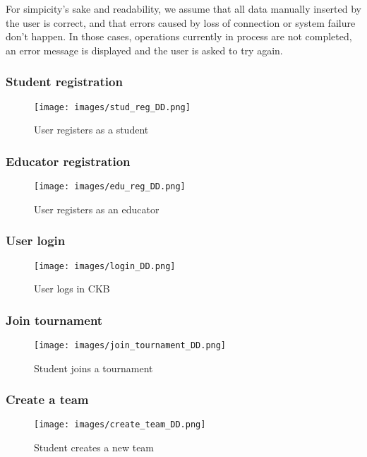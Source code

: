 \documentclass[a4paper, 11pt, titlepage]{article}
\begin{document}
For simpicity's sake and readability, we assume that all data manually inserted by the user is correct, and that errors caused by loss of connection or system failure don't happen. In those cases,
operations currently in process are not completed, an error message is displayed and the user is asked to try again.

\subsubsection*{Student registration}

\begin{figure}[H]
  \centering
  \texttt{[image: images/stud\_reg\_DD.png]}
  \caption{User registers as a student}
  \label{fig:seq_diag_stud_reg}
  
\end{figure}

\subsubsection*{Educator registration}

\begin{figure}[H]
  \centering
  \texttt{[image: images/edu\_reg\_DD.png]}
  \caption{User registers as an educator}
  \label{fig:seq_diag_edu_reg}
  
\end{figure}

\subsubsection*{User login}

\begin{figure}[H]
  \centering
  \texttt{[image: images/login\_DD.png]}
  \caption{User logs in CKB}
  \label{fig:seq_diag_login}
  
\end{figure}

\subsubsection*{Join tournament}
\begin{figure}[H]
  \centering
  \texttt{[image: images/join\_tournament\_DD.png]}
  \caption{Student joins a tournament}
  \label{fig:seq_diag_join_tourn}
\end{figure}

\subsubsection*{Create a team}
\begin{figure}[H]
  \centering
  \texttt{[image: images/create\_team\_DD.png]}
  \caption{Student creates a new team}
  \label{fig:seq_diag_create_team}
\end{figure}
\end{document}

